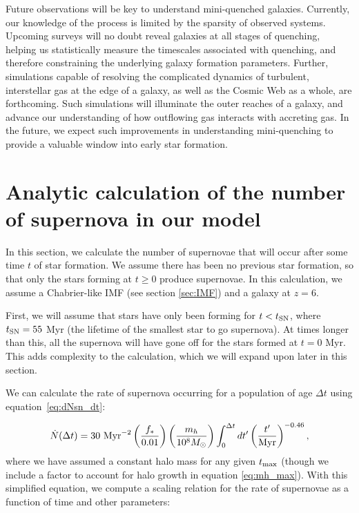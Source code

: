 \documentclass[a4paper,11pt]{article}
\begin{document}
Future observations will be key to understand mini-quenched galaxies. Currently, our knowledge of the process is limited by the sparsity of observed systems. Upcoming surveys will no doubt reveal galaxies at all stages of quenching, helping us statistically measure the timescales associated with quenching, and therefore constraining the underlying galaxy formation parameters. Further, simulations capable of resolving the complicated dynamics of turbulent, interstellar gas at the edge of a galaxy, as well as the Cosmic Web as a whole, are forthcoming. Such simulations will illuminate the outer reaches of a galaxy, and advance our understanding of how outflowing gas interacts with accreting gas. In the future, we expect such improvements in understanding mini-quenching to provide a valuable window into early star formation.

\appendix

\section{Analytic calculation of the number of supernova in our model} \label{sec:N_analytic}

In this section, we calculate the number of supernovae that will occur after some time $t$ of star formation. We assume there has been no previous star formation, so that only the stars forming at $t \geq  0$ produce supernovae. In this calculation, we assume a Chabrier-like IMF (see section \ref{sec:IMF}) and a galaxy at $z = 6$. 

First, we will assume that stars have only been forming for $t < t_{\rm SN}$, where $t_{\rm SN} = 55$ Myr (the lifetime of the smallest star to go supernova). At times longer than this, all the supernova will have gone off for the stars formed at $t = 0$ Myr. This adds complexity to the calculation, which we will expand upon later in this section.

We can calculate the rate of supernova occurring for a population of age $\Delta t$ using equation~\ref{eq:dNsn_dt}:

\begin{equation}
    \dot{N} (\Delta t) = 30 \ \mathrm{Myr}^{-2} \left( \frac{f_{*}}{0.01} \right) \left( \frac{m_{h}}{10^{8} M_{\odot}} \right) \int_{0}^{\Delta t} dt' \left( \frac{t'}{\rm Myr} \right)^{-0.46},
\end{equation}
%
where we have assumed a constant halo mass for any given $t_{\rm max}$ (though we include a factor to account for halo growth in equation \ref{eq:mh_max}). With this simplified equation, we compute a scaling relation for the rate of supernovae as a function of time and other parameters:
\end{document}

